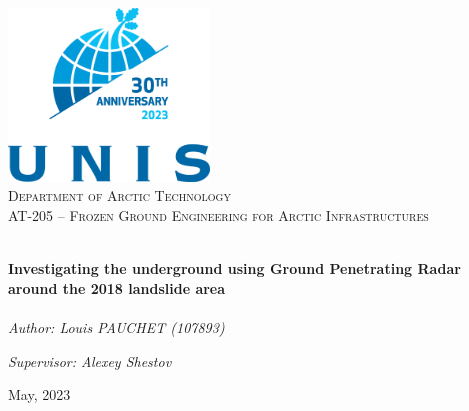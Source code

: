 \begin{titlepage}
\vbox{}
\vbox{}
\begin{center}
\includegraphics[width=0.40\textwidth]{Images/UNIS_logo.png}\\[2cm]
\textsc{\LARGE Department of Arctic Technology}\\[1.5cm]
\textsc{\Large AT-205 -- Frozen Ground Engineering for Arctic Infrastructures}\\[0.5cm]
\vbox{}

\HRule \\[0.5cm]
{ \huge \bfseries Investigating the underground using Ground Penetrating Radar around the 2018 landslide area }\\[0.5cm]
\HRule \\[1.5cm]

\large
\emph{Author: Louis PAUCHET (107893)} 

\emph{Supervisor: Alexey Shestov} 

\vspace{2.5cm}

{\large May, 2023}

\vfill


\end{center}

\doclicenseThis

\end{titlepage}